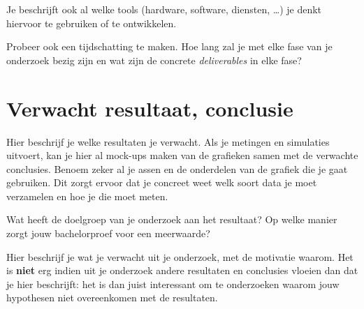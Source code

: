 Je beschrijft ook al welke tools (hardware, software, diensten, \ldots) je denkt hiervoor te gebruiken of te ontwikkelen.

Probeer ook een tijdschatting te maken. Hoe lang zal je met elke fase van je onderzoek bezig zijn en wat zijn de concrete \emph{deliverables} in elke fase?

\section{Verwacht resultaat, conclusie}%
\label{sec:verwachte_resultaten}

Hier beschrijf je welke resultaten je verwacht. Als je metingen en simulaties uitvoert, kan je hier al mock-ups maken van de grafieken samen met de verwachte conclusies. Benoem zeker al je assen en de onderdelen van de grafiek die je gaat gebruiken. Dit zorgt ervoor dat je concreet weet welk soort data je moet verzamelen en hoe je die moet meten.

Wat heeft de doelgroep van je onderzoek aan het resultaat? Op welke manier zorgt jouw bachelorproef voor een meerwaarde?

Hier beschrijf je wat je verwacht uit je onderzoek, met de motivatie waarom. Het is \textbf{niet} erg indien uit je onderzoek andere resultaten en conclusies vloeien dan dat je hier beschrijft: het is dan juist interessant om te onderzoeken waarom jouw hypothesen niet overeenkomen met de resultaten.

